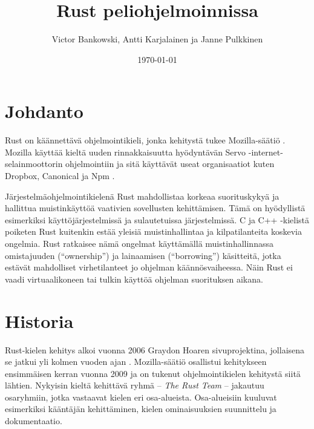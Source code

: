 \documentclass[finnish]{tktltiki2}
\title{Rust peliohjelmoinnissa}
\author{Victor Bankowski, Antti Karjalainen ja Janne Pulkkinen}
\date{\today}
\theoremstyle{definition}
\theoremstyle{remark}
\begin{document}

\frontmatter      %

\maketitle        %
\makeabstract     %

\tableofcontents  %


\mainmatter       %

\section{Johdanto}

Rust on käännettävä ohjelmointikieli, jonka kehitystä tukee Mozilla-säätiö \cite{servo}. Mozilla käyttää kieltä uuden rinnakkaisuutta hyödyntävän Servo -internet-selainmoottorin ohjelmointiin ja sitä käyttävät useat organisaatiot kuten Dropbox, Canonical ja Npm \cite{RustFriends}.

Järjestelmäohjelmointikielenä Rust mahdollistaa korkeaa suorituskykyä ja hallittua muistinkäyttöä vaativien sovellusten kehittämisen. Tämä on hyödyllistä esimerkiksi käyttöjärjestelmissä ja sulautetuissa järjestelmissä. C ja C++ -kielistä poiketen Rust kuitenkin estää yleisiä muistinhallintaa ja kilpatilanteita koskevia ongelmia. Rust ratkaisee nämä ongelmat käyttämällä muistinhallinnassa omistajuuden (“ownership”) ja lainaamisen (“borrowing”) käsitteitä, jotka estävät mahdolliset virhetilanteet jo ohjelman käännösvaiheessa. Näin Rust ei vaadi virtuaalikoneen tai tulkin käyttöä ohjelman suorituksen aikana.

\section{Historia}

Rust-kielen kehitys alkoi vuonna 2006 Graydon Hoaren sivuprojektina, jollaisena se jatkui yli kolmen vuoden ajan \cite{RustFaq}. Mozilla-säätiö osallistui kehitykseen ensimmäisen kerran vuonna 2009 ja on tukenut ohjelmointikielen kehitystä siitä lähtien. Nykyisin kieltä kehittävä ryhmä -- \textit{The Rust Team} -- jakautuu osaryhmiin, jotka vastaavat kielen eri osa-alueista. Osa-alueisiin kuuluvat esimerkiksi kääntäjän kehittäminen, kielen ominaisuuksien suunnittelu ja dokumentaatio.
\end{document}
